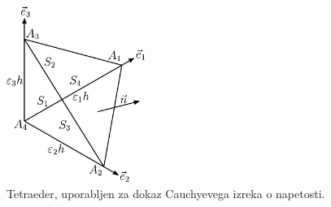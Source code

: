 \documentclass[12pt,a4paper]{article}
\theoremstyle{definition} %
\theoremstyle{plain} %
\numberwithin{equation}{section}
\begin{document}
\begin{figure}[h]
  \centering
  \includegraphics[width=0.4\textwidth]{images/cauchy_tetrahedron.pdf}
  \caption{Tetraeder, uporabljen za dokaz Cauchyevega izreka o napetosti.}
  \label{fig:tetra}
\end{figure}
\end{document}
